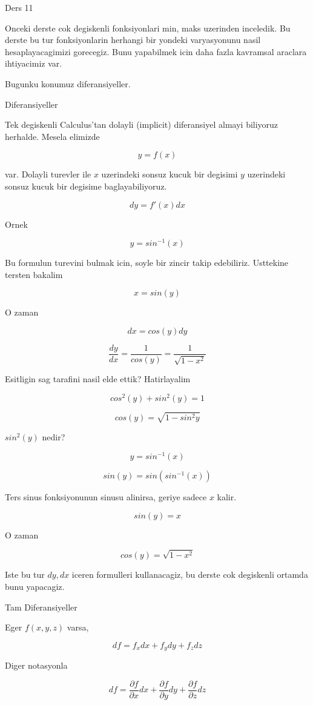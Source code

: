 \documentclass[12pt,fleqn]{article}\usepackage{../common}
\begin{document}
Ders 11

Onceki derste cok degiskenli fonksiyonlari min, maks uzerinden
inceledik. Bu derste bu tur fonksiyonlarin herhangi bir yondeki
varyasyonunu nasil hesaplayacagimizi gorecegiz. Bunu yapabilmek icin daha
fazla kavramsal araclara ihtiyacimiz var. 

Bugunku konumuz diferansiyeller. 

Diferansiyeller

Tek degiskenli Calculus'tan dolayli (implicit) diferansiyel almayi
biliyoruz herhalde. Mesela elimizde

\[ y = f(x) \]

var. Dolayli turevler ile $x$ uzerindeki sonsuz kucuk bir degisimi $y$
uzerindeki sonsuz kucuk bir degisime baglayabiliyoruz. 

\[ dy = f'(x) dx \]

Ornek

\[ y = sin^{-1}(x) \]

Bu formulun turevini bulmak icin, soyle bir zincir takip
edebiliriz. Usttekine tersten bakalim

\[ x = sin(y) \]

O zaman

\[ dx = cos(y)dy \]

\[ 
\frac{dy}{dx} = \frac{1}{cos(y)} = \frac{1}{\sqrt{1-x^2}}
 \]

Esitligin sag tarafini nasil elde ettik? Hatirlayalim

\[ cos^2(y) + sin^2(y) = 1 \]

\[ cos (y) = \sqrt{1 - sin^2y} \]

$sin^2(y)$ nedir? 

\[ y = sin^{-1}(x) \]

\[ sin(y) = sin(sin^{-1}(x)) \]

Ters sinus fonksiyonunun sinusu alinirsa, geriye sadece $x$ kalir. 

\[ sin(y) = x \]

O zaman

\[ cos (y) = \sqrt{1 - x^2} \]

Iste bu tur $dy,dx$ iceren formulleri kullanacagiz, bu derste cok
degiskenli ortamda bunu yapacagiz. 

Tam Diferansiyeller

Eger $f(x,y,z)$ varsa, 

\[ df = f_xdx + f_ydy + f_zdz \]

Diger notasyonla

\[ df = \frac{\partial f}{\partial x}dx + \frac{\partial f}{\partial y}dy + 
\frac{\partial f}{\partial z}dz \]
\end{document}
